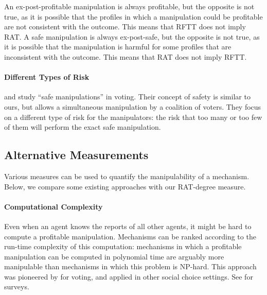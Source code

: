 An ex-post-profitable manipulation is always profitable, but the opposite is not true, as it is possible that the profiles in which a manipulation could be profitable are not consistent with the outcome. This means that RFTT does not imply RAT.
%
A safe manipulation is always ex-post-safe, but the opposite is not true, as it is possible that the manipulation is harmful for some profiles that are inconsistent with the outcome. This means that RAT does not imply RFTT.



\paragraph{Different Types of Risk}
\citet{slinko2008nondictatorial,slinko2014ever} and \citet{hazon2010complexity} study ``safe manipulations'' in voting. Their concept of safety is similar to ours, but allows a simultaneous manipulation by a coalition of voters. They focus on a different type of risk for the manipulators: the risk that too many or too few of them will perform the exact safe manipulation.

\subsection{Alternative Measurements}
Various measures can be used to quantify the manipulability of a mechanism. Below, we compare some existing approaches with our RAT-degree measure.

\paragraph{Computational Complexity}
Even when an agent knows the reports of all other agents, it might be hard to compute a profitable manipulation. 
Mechanisms can be ranked according to the run-time complexity of this computation: mechanisms in which a profitable manipulation can be computed in polynomial time are arguably more manipulable than mechanisms in which this problem is NP-hard. 
This approach was pioneered by \citet{bartholdi1989computational,bartholdi1991single} for voting, and applied in other social choice settings. See \citet{faliszewski2010ai,veselova2016computational} for surveys.

